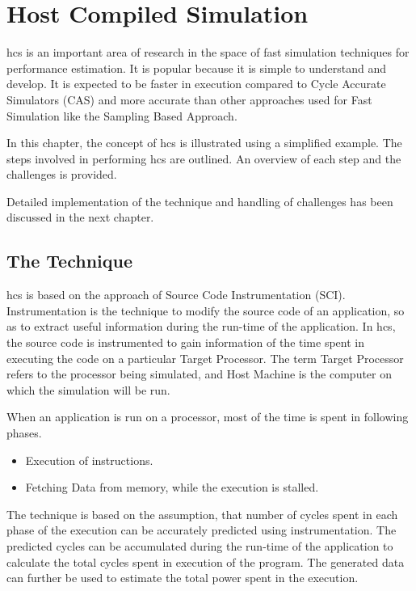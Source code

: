 \chapter{Host Compiled Simulation}

\gls{hcs} is an important area of research in the space of fast simulation techniques for performance estimation. It is popular because it is simple to understand and develop. It is expected to be faster in execution compared to Cycle Accurate Simulators (CAS) and more accurate than other approaches used for Fast Simulation like the Sampling Based Approach.

In this chapter, the concept of \gls{hcs} is illustrated using a simplified example. The steps involved in performing \gls{hcs} are outlined. An overview of each step and the challenges is provided. 

Detailed implementation of the technique and handling of challenges has been discussed in the next chapter.

\section{The Technique}
\gls{hcs} is based on the approach of Source Code Instrumentation (SCI). Instrumentation is the technique to modify the source code of an application, so as to extract useful information during the run-time of the application. In \gls{hcs}, the source code is instrumented to gain information of the time spent in executing the code on a particular Target Processor. The term Target Processor refers to the processor being simulated, and Host Machine is the computer on which the simulation will be run.

When an application is run on a processor, most of the time is spent in following phases.
\begin{itemize} \itemsep -6pt
\item Execution of instructions.
\item Fetching Data from memory, while the execution is stalled.
\end{itemize}

The technique is based on the assumption, that number of cycles spent in each phase of the execution can be accurately predicted using instrumentation. The predicted cycles can be accumulated during the run-time of the application to calculate the total cycles spent in execution of the program. The generated data can further be used to estimate the total power spent in the execution.

